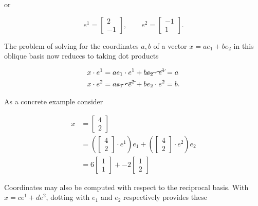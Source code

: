 or

\begin{equation}\label{eqn:gramSchmidtLorentz:190}
e^1 =
\begin{bmatrix}
2 \\
-1
\end{bmatrix}, \qquad
e^2 =
\begin{bmatrix}
-1 \\
1
\end{bmatrix}.
\end{equation}

The problem of solving for the coordinates $a,b$ of a vector $x = a e_1 + b e_2$ in this oblique basis now reduces to taking dot products

\begin{align}\label{eqn:gramSchmidtLorentz:920}
x \cdot e^1 &= a e_1 \cdot e^1 + b \cancel{e_2 \cdot e^1} = a \\
x \cdot e^2 &= a \cancel{e_1 \cdot e^2} + b e_2 \cdot e^2 = b.
\end{align}

As a concrete example consider

\begin{equation}\label{eqn:gramSchmidtLorentz:230}
\begin{aligned}
x &=
\begin{bmatrix}
4 \\
2
\end{bmatrix}  \\
&=
\left(
\begin{bmatrix}
4 \\
2
\end{bmatrix}
\cdot e^1
\right)
e_1
+
\left(
\begin{bmatrix}
4 \\
2
\end{bmatrix}
\cdot e^2
\right)
e_2 \\
&= 6
\begin{bmatrix}
1 \\
1
\end{bmatrix}
+
-2
\begin{bmatrix}
1 \\
2
\end{bmatrix}
\end{aligned}
\end{equation}

Coordinates may also be computed with respect to the reciprocal basis.  With $x = c e^1 + d e^2$, dotting with $e_1$ and $e_2$ respectively provides these

